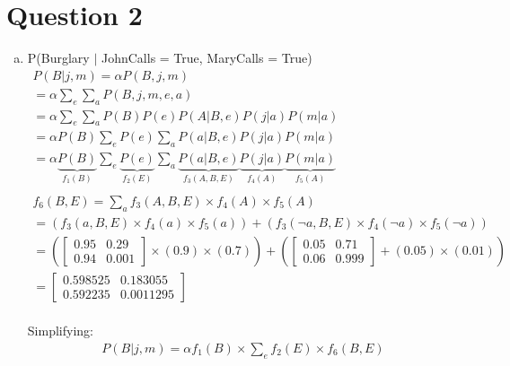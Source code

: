 \documentclass{article}
\begin{document}
\section*{Question 2}
\begin{enumerate}[a)] %
    \item P(Burglary $|$ JohnCalls = True, MaryCalls = True)
    \begin{gather*}
        P(B | j,m) = \alpha P(B, j, m) \\
        = \alpha \sum_{e} \sum_{a} P(B, j, m, e, a) \\
        = \alpha \sum_{e} \sum_{a} P(B)P(e)P(A|B,e)P(j|a)P(m|a) \\
        = \alpha P(B)\sum_{e}P(e)\sum_{a}P(a|B,e)P(j|a)P(m|a) \\
        = \alpha \underbrace{P(B)}_{f_1(B)}
            \sum_{e}\underbrace{P(e)}_{f_2(E)}
            \sum_{a}\underbrace{P(a|B,e)}_{f_3(A, B, E)}
                \underbrace{P(j|a)}_{f_4(A)}
                \underbrace{P(m|a)}_{f_5(A)}\\
                \\
        f_6(B,E) = \sum_{a}f_3(A, B, E)\times f_4(A)\times f_5(A) \\
        = (f_3(a, B, E) \times f_4(a) \times f_5(a)) +
            (f_3(\neg a, B, E) \times f_4(\neg a) \times f_5(\neg a))
    \end{gather*}
    \begin{gather*}
        = (
        \begin{bmatrix}
            0.95 & 0.29 \\
            0.94 & 0.001
        \end{bmatrix}
        \times (0.9) \times (0.7)) + (
        \begin{bmatrix}
            0.05 & 0.71 \\
            0.06 & 0.999
        \end{bmatrix}
        + (0.05) \times (0.01))\\
        =
        \begin{bmatrix}
            0.598525 & 0.183055 \\
            0.592235 & 0.0011295
        \end{bmatrix}
    \end{gather*}
    \\
    Simplifying:
    \begin{gather*}
        P(B|j,m) = \alpha f_1(B) \times \sum_{e} f_2(E) \times f_6(B, E)\\

\end{gather*}
\end{enumerate}
\end{document}
